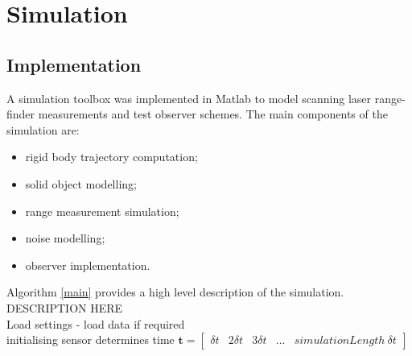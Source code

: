 \chapter{Simulation}
\section{Implementation}
A simulation toolbox was implemented in Matlab to model scanning laser range-finder measurements and test observer schemes. The main components of the simulation are:
\begin{itemize}
\item rigid body trajectory computation;
\item solid object modelling;
\item range measurement simulation;
\item noise modelling;
\item observer implementation.
\end{itemize}

Algorithm \ref{main} provides a high level description of the simulation.\\
DESCRIPTION HERE\\
Load settings - load data if required\\
initialising sensor determines time $\mathbf{t} 
= \begin{bmatrix} \delta t & 2\delta t  & 3\delta t & \dots & simulationLength\:\delta t \end{bmatrix}$


